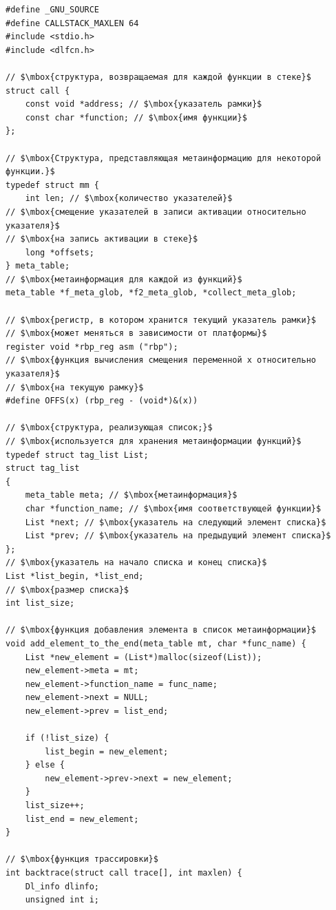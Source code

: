 \begin{lstlisting}[mathescape=true]
#define _GNU_SOURCE
#define CALLSTACK_MAXLEN 64
#include <stdio.h>
#include <dlfcn.h>

// $\mbox{структура, возвращаемая для каждой функции в стеке}$
struct call {
    const void *address; // $\mbox{указатель рамки}$
	const char *function; // $\mbox{имя функции}$
};

// $\mbox{Структура, представляющая метаинформацию для некоторой функции.}$
typedef struct mm {
	int len; // $\mbox{количество указателей}$
// $\mbox{смещение указателей в записи активации относительно указателя}$
// $\mbox{на запись активации в стеке}$
	long *offsets;
} meta_table;
// $\mbox{метаинформация для каждой из функций}$
meta_table *f_meta_glob, *f2_meta_glob, *collect_meta_glob;

// $\mbox{регистр, в котором хранится текущий указатель рамки}$
// $\mbox{может меняться в зависимости от платформы}$
register void *rbp_reg asm ("rbp");
// $\mbox{функция вычисления смещения переменной x относительно указателя}$
// $\mbox{на текущую рамку}$
#define OFFS(x) (rbp_reg - (void*)&(x))

// $\mbox{структура, реализующая список;}$
// $\mbox{используется для хранения метаинформации функций}$
typedef struct tag_list List;
struct tag_list
{
	meta_table meta; // $\mbox{метаинформация}$
	char *function_name; // $\mbox{имя соответствующей функции}$
	List *next; // $\mbox{указатель на следующий элемент списка}$
	List *prev; // $\mbox{указатель на предыдущий элемент списка}$
};
// $\mbox{указатель на начало списка и конец списка}$
List *list_begin, *list_end;
// $\mbox{размер списка}$
int list_size;

// $\mbox{функция добавления элемента в список метаинформации}$
void add_element_to_the_end(meta_table mt, char *func_name) {
	List *new_element = (List*)malloc(sizeof(List));
	new_element->meta = mt;
	new_element->function_name = func_name;
	new_element->next = NULL;
	new_element->prev = list_end;
	
	if (!list_size)	{
		list_begin = new_element;
	} else {
		new_element->prev->next = new_element;
	}
	list_size++;
	list_end = new_element;
}

// $\mbox{функция трассировки}$
int backtrace(struct call trace[], int maxlen) {
	Dl_info dlinfo;
	unsigned int i;


\end{lstlisting}
